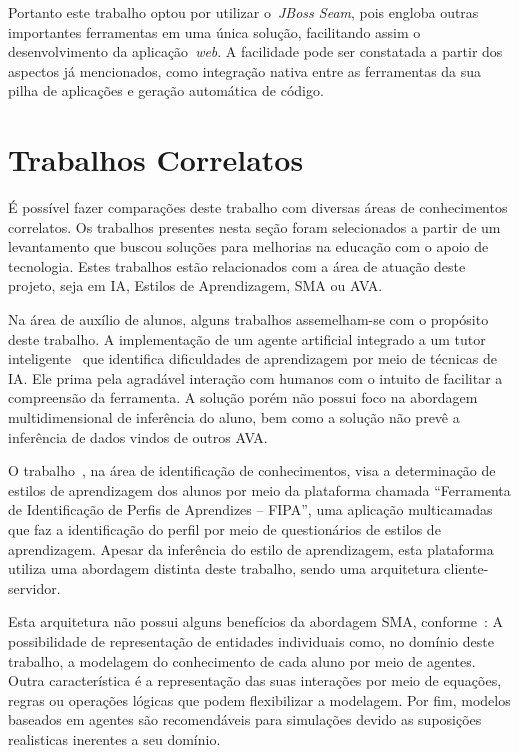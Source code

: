 Portanto este trabalho optou por utilizar o~\emph{JBoss Seam}, pois engloba outras importantes ferramentas em uma única solução, facilitando assim o desenvolvimento da aplicação~\emph{web}. A facilidade pode ser constatada a partir dos aspectos já mencionados, como integração nativa entre as ferramentas da sua pilha de aplicações e geração automática de código.

\section{Trabalhos Correlatos}\label{section:trabcorrelatos}
É possível fazer comparações deste trabalho com diversas áreas de conhecimentos correlatos. Os trabalhos presentes nesta seção foram selecionados a partir de um levantamento que buscou soluções para melhorias na educação com o apoio de tecnologia. Estes trabalhos estão relacionados com a área de atuação deste projeto, seja em IA, Estilos de Aprendizagem, SMA ou AVA.

Na área de auxílio de alunos, alguns trabalhos assemelham-se com o propósito deste trabalho. A implementação de um agente artificial integrado a um tutor inteligente~\cite{soaresagente} que identifica dificuldades de aprendizagem por meio de técnicas de IA. Ele prima pela agradável interação com humanos com o intuito de facilitar a compreensão da ferramenta. A solução porém não possui foco na abordagem multidimensional de inferência do aluno, bem como a solução não prevê a inferência de dados vindos de outros AVA.

O trabalho~\cite{bativa2011}, na área de identificação de conhecimentos, visa a determinação de estilos de aprendizagem dos alunos por meio da plataforma chamada ``Ferramenta de Identificação de Perfis de Aprendizes – FIPA'', uma aplicação multicamadas que faz a identificação do perfil por meio de questionários de estilos de aprendizagem. Apesar da inferência do estilo de aprendizagem, esta plataforma utiliza uma abordagem distinta deste trabalho, sendo uma arquitetura cliente-servidor. 

Esta arquitetura não possui alguns benefícios da abordagem SMA, conforme~\cite{helbing11}: A possibilidade de representação de entidades individuais como, no domínio  deste trabalho, a modelagem do conhecimento de cada aluno por meio de agentes. Outra característica é a representação das suas interações por meio de equações, regras ou operações lógicas que podem flexibilizar a modelagem. Por fim, modelos baseados em agentes são recomendáveis para simulações devido as suposições realisticas inerentes a seu domínio.

